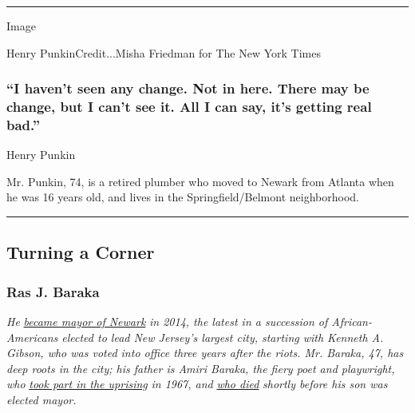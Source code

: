 \begin{center}\rule{0.5\linewidth}{\linethickness}\end{center}

Image

Henry PunkinCredit...Misha Friedman for The New York Times

\hypertarget{i-havent-seen-any-change-not-in-here-there-may-be-change-but-i-cant-see-it-all-i-can-say-its-getting-real-bad}{%
\subsubsection{``I haven't seen any change. Not in here. There may be
change, but I can't see it. All I can say, it's getting real
bad.''}\label{i-havent-seen-any-change-not-in-here-there-may-be-change-but-i-cant-see-it-all-i-can-say-its-getting-real-bad}}

Henry Punkin

Mr. Punkin, 74, is a retired plumber who moved to Newark from Atlanta
when he was 16 years old, and lives in the Springfield/Belmont
neighborhood.

\begin{center}\rule{0.5\linewidth}{\linethickness}\end{center}

\hypertarget{turning-a-corner}{%
\subsection{Turning a Corner}\label{turning-a-corner}}

\hypertarget{ras-j-baraka}{%
\subsubsection{Ras J. Baraka}\label{ras-j-baraka}}

\emph{He}
\href{https://www.nytimes.com/2014/05/14/nyregion/newark-mayoral-race.html}{\emph{became
mayor of Newark}} \emph{in 2014, the latest in a succession of
African-Americans elected to lead New Jersey's largest city, starting
with Kenneth A. Gibson, who was voted into office three years after the
riots. Mr. Baraka, 47, has deep roots in the city; his father is Amiri
Baraka, the fiery poet and playwright, who}
\href{http://www.nytimes.com/2012/10/11/nyregion/amiri-baraka-newark-poet-looks-back-on-a-bloody-week-in-1967.html}{\emph{took
part in the uprising}} \emph{in 1967, and}
\href{https://www.nytimes.com/2014/01/10/arts/amiri-baraka-polarizing-poet-and-playwright-dies-at-79.html}{\emph{who
died}} \emph{shortly before his son was elected mayor.}

